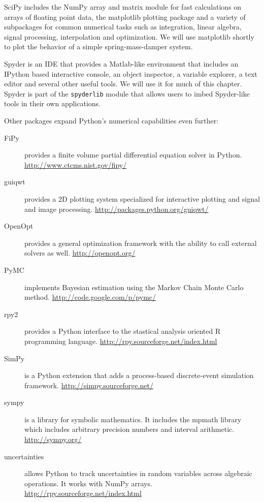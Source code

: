 \documentclass{report}
\begin{document}
SciPy\cite{website:scipy} includes the NumPy array and matrix module for fast calculations on arrays of floating point data, the matplotlib plotting package and a variety of subpackages for common numerical tasks such as integration, linear algebra, signal processing, interpolation and optimization. We will use matplotlib\cite{website:matplotlib} shortly to plot the behavior of a simple spring-mass-damper system.

Spyder is an IDE that provides a Matlab-like environment that includes an IPython based interactive console, an object inspector, a variable explorer, a text editor and several other useful tools. We will use it for much of this chapter. Spyder is part of the \verb|spyderlib| module that allows users to imbed Spyder-like tools in their own applications.

Other packages expand Python's numerical capabilities even further:

\begin{description}
	\item[FiPy] provides a finite volume partial differential equation solver in Python. \url{http://www.ctcms.nist.gov/fipy/}
	\item[guiqwt] provides a 2D plotting system specialized for interactive plotting and signal and image processing. \url{http://packages.python.org/guiqwt/}
	\item[OpenOpt] provides a general optimization framework with the ability to call external solvers as well. \url{http://openopt.org/}
	\item[PyMC] implements Bayesian estimation using the Markov Chain Monte Carlo method. \url{http://code.google.com/p/pymc/}
	\item[rpy2] provides a Python interface to the stastical analysis oriented R programming language. \url{http://rpy.sourceforge.net/index.html}
	\item[SimPy] is a Python extension that adds a process-based discrete-event simulation framework. \url{http://simpy.sourceforge.net/}
	\item[sympy] is a library for symbolic mathematics. It includes the mpmath library which includes arbitrary precision numbers and interval arithmetic. \url{http://sympy.org/}
	\item[uncertainties] allows Python to track uncertainties in random variables across algebraic operations. It works with NumPy arrays. \url{http://rpy.sourceforge.net/index.html}
\end{description}
\end{document}
